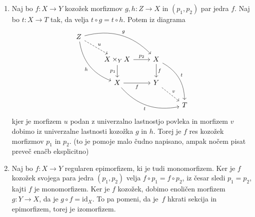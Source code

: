 \documentclass[../kategoricna_logika.tex]{subfiles}
\begin{document}
\begin{dokaz}
\begin{enumerate}[label=(\roman*)]
  \item  %
    Naj bo $f : X \to Y$ kozožek morfizmov $g,h : Z \to X$ in $(p_1, p_2)$ par jedra $f$.
    Naj bo $t : X \to T$ tak, da velja $t \circ g = t \circ h$. Potem iz diagrama
    \begin{equation*}
    \begin{tikzcd}[row sep=normal, column sep=normal]
      Z \ar[ddr, bend right, "h"'] \ar[dr, dashed, "u"] \ar[drr, bend left, "g"] & & & \\
      & X \times_Y X \ar[d, "p_1"'] \ar[r, "p_2"] & X \ar[d, "f"] \ar[ddr, bend left, "t"] & \\
      & X \ar[r, "f"'] \ar[drr, bend right, "t"'] & Y \ar[dr, dashed, "v"] & \\
      & & & T
    \end{tikzcd}
    \end{equation*}
    kjer je morfizem $u$ podan z univerzalno lastnostjo povleka in morfizem $v$ dobimo iz univerzalne lastnosti kozožka $g$ in $h$.
    Torej je $f$ res kozožek morfizmov $p_1$ in $p_2$.
    (to je pomoje malo čudno napisano, ampak nočem pisat preveč enačb eksplicitno)

  \item %
    Naj bo $f : X \to Y$ regularen epimorfizem, ki je tudi monomorfizem.
    Ker je $f$ kozožek svojega para jedra $(p_1, p_2)$ velja $f \circ p_1 = f \circ p_2$,
    iz česar sledi $p_1 = p_2$, kajti $f$ je monomorfizem.
    Ker je $f$ kozožek, dobimo enoličen morfizem $g : Y \to X$, da je $g \circ f = \mathrm{id}_X$.
    To pa pomeni, da je~$f$ hkrati sekcija in epimorfizem, torej je izomorfizem.


\end{enumerate}
\end{dokaz}
\end{document}

